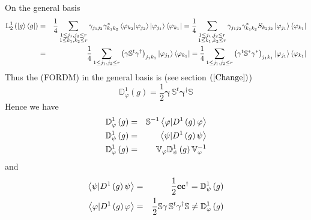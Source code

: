 \documentclass[aps,preprint]{revtex4}
\begin{document}
On the general basis 
\begin{eqnarray}
\mathrm{L}_{2}^{1}\left( \left\vert g\right\rangle \left\langle g\right\vert
\right) &=&\frac{1}{4}\sum_{\substack{ 1\leq j_{1},j_{2}\leq r  \\ 1\leq
k_{1},k_{2}\leq r}}\gamma _{j_{1}j_{2}}\gamma _{k_{1}k_{2}}^{\ast
}\left\langle \varphi _{k_{2}}|\varphi _{j_{2}}\right\rangle \left\vert
\varphi _{j_{1}}\right\rangle \left\langle \varphi _{k_{1}}\right\vert =%
\frac{1}{4}\sum_{\substack{ 1\leq j_{1},j_{2}\leq r  \\ 1\leq
k_{1},k_{2}\leq r}}\gamma _{j_{1}j_{2}}\gamma _{k_{1}k_{2}}^{\ast
}S_{k_{2}j_{2}}\left\vert \varphi _{j_{1}}\right\rangle \left\langle \varphi
_{k_{1}}\right\vert  \notag \\
&=&\frac{1}{4}\sum_{1\leq j_{1},j_{2}\leq r}\left( \mathbf{\gamma }\mathbb{S}%
^{t}\mathbf{\gamma }^{\dagger }\right) _{j_{1}k_{1}}\left\vert \varphi
_{j_{1}}\right\rangle \left\langle \varphi _{k_{1}}\right\vert =\frac{1}{4}%
\sum_{1\leq j_{1},j_{2}\leq r}\left( \mathbf{\gamma }^{t}\mathbb{S}^{\ast }%
\mathbf{\gamma }^{\ast }\right) _{j_{1}k_{1}}\left\vert \varphi
_{j_{1}}\right\rangle \left\langle \varphi _{k_{1}}\right\vert
\end{eqnarray}%
Thus the (FORDM) in the general basis is (see section $\left( \ref{Change}%
\right) $) 
\begin{equation}
\mathbb{D}_{\varphi }^{1}\left( g\right) =\frac{1}{2}\mathbf{\gamma \,}%
\mathbb{S}^{t}\mathbf{\gamma }^{\dagger }\mathbb{S}
\end{equation}%
Hence we have 
\begin{eqnarray}
\mathbb{D}_{\varphi }^{1}\left( g\right) &=&\mathbb{S}^{-1}\left\langle 
\mathbf{\varphi }|D^{1}\left( g\right) \mathbf{\varphi }\right\rangle  \notag
\\
\mathbb{D}_{\psi }^{1}\left( g\right) &=&\left\langle \mathbf{\psi }%
|D^{1}\left( g\right) \mathbf{\psi }\right\rangle  \notag \\
\mathbb{D}_{\varphi }^{1}\left( g\right) &=&\mathbb{V}_{\varphi }\mathbb{D}%
_{\psi }^{1}\left( g\right) \mathbb{V}_{\varphi }^{-1}  \label{dentran}
\end{eqnarray}%
and 
\begin{eqnarray}
\left\langle \mathbf{\psi }|D^{1}\left( g\right) \mathbf{\psi }\right\rangle
&=&\frac{1}{2}\mathbf{cc}^{\dagger }=\mathbb{D}_{\psi }^{1}\left( g\right) 
\notag \\
\left\langle \mathbf{\varphi }|D^{1}\left( g\right) \mathbf{\varphi }%
\right\rangle &=&\frac{1}{2}\mathbb{S}\mathbf{\gamma \,}\mathbb{S}^{t}%
\mathbf{\gamma }^{\dagger }\mathbb{S}\neq \mathbb{D}_{\varphi }^{1}\left(
g\right)
\end{eqnarray}%
\end{document}
